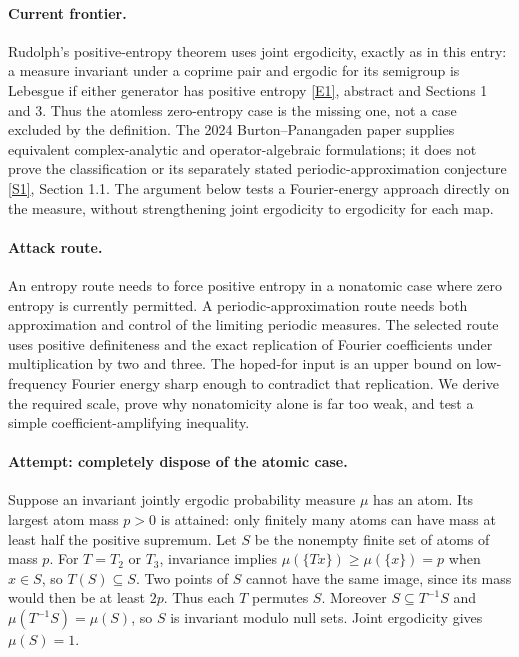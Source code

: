 \documentclass[11pt,a4paper]{article}
\newcommand{\sref}[2]{\hyperlink{source:#1:#2}{[S#2]}}
\newcommand{\eref}[2]{\hyperlink{extra:#1:#2}{[E#2]}}
\numberwithin{equation}{section}
\begin{document}
\paragraph{Current frontier.}
Rudolph's positive-entropy theorem uses joint ergodicity, exactly as in
this entry: a measure invariant under a coprime pair and ergodic for its
semigroup is Lebesgue if either generator has positive entropy
\eref{statement}{1}, abstract and Sections 1 and 3. Thus the atomless zero-entropy
case is the missing one, not a case excluded by the definition. The 2024
Burton--Panangaden paper supplies equivalent complex-analytic and
operator-algebraic formulations; it does not prove the classification or
its separately stated periodic-approximation conjecture
\sref{statement}{1}, Section 1.1. The argument below tests a Fourier-energy
approach directly on the measure, without strengthening joint ergodicity
to ergodicity for each map.

\paragraph{Attack route.}
An entropy route needs to force positive entropy in a nonatomic case where
zero entropy is currently permitted. A periodic-approximation route needs
both approximation and control of the limiting periodic measures. The
selected route uses positive definiteness and the exact replication of
Fourier coefficients under multiplication by two and three. The hoped-for
input is an upper bound on low-frequency Fourier energy sharp enough to
contradict that replication. We derive the required scale, prove why
nonatomicity alone is far too weak, and test a simple coefficient-amplifying
inequality.

\paragraph{Attempt: completely dispose of the atomic case.}
Suppose an invariant jointly ergodic probability measure $\mu$ has an atom.
Its largest atom mass $p>0$ is attained: only finitely many atoms can have
mass at least half the positive supremum. Let $S$ be the nonempty finite
set of atoms of mass $p$. For $T=T_2$ or $T_3$, invariance implies
$\mu(\{Tx\})\ge\mu(\{x\})=p$ when $x\in S$, so $T(S)\subseteq S$.
Two points of $S$ cannot have the same image, since its mass would then be
at least $2p$. Thus each $T$ permutes $S$. Moreover $S\subseteq T^{-1}S$
and $\mu(T^{-1}S)=\mu(S)$, so $S$ is invariant modulo null sets.
Joint ergodicity gives $\mu(S)=1$.
\end{document}
